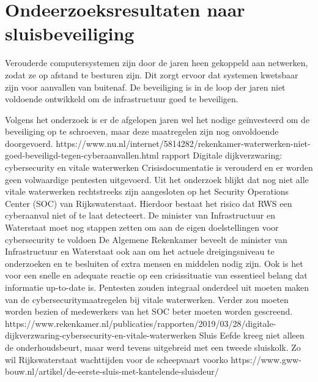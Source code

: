  







 









\section{Ondeerzoeksresultaten naar sluisbeveiliging}



Verouderde computersystemen zijn door de jaren heen gekoppeld aan netwerken, zodat ze op afstand te besturen zijn. Dit zorgt ervoor dat systemen kwetsbaar zijn voor aanvallen van buitenaf. De beveiliging is in de loop der jaren niet voldoende ontwikkeld om de infrastructuur goed te beveiligen.

Volgens het onderzoek is er de afgelopen jaren wel het nodige geïnvesteerd om de beveiliging op te schroeven, maar deze maatregelen zijn nog onvoldoende doorgevoerd.
https://www.nu.nl/internet/5814282/rekenkamer-waterwerken-niet-goed-beveiligd-tegen-cyberaanvallen.html
rapport Digitale dijkverzwaring: cybersecurity en vitale waterwerken 
Crisisdocumentatie is verouderd en er worden geen volwaardige pentesten uitgevoerd. Uit het onderzoek blijkt dat nog niet alle vitale waterwerken rechtstreeks zijn aangesloten op het Security Operations Center (SOC) van Rijkswaterstaat. Hierdoor bestaat het risico dat RWS een cyberaanval niet of te laat detecteert. De minister van Infrastructuur en Waterstaat moet nog stappen zetten om aan de eigen doelstellingen voor cybersecurity te voldoen
De Algemene Rekenkamer beveelt de minister van Infrastructuur en Waterstaat ook aan om het actuele dreigingsniveau te onderzoeken en te besluiten of extra mensen en middelen nodig zijn. Ook is het voor een snelle en adequate reactie op een crisissituatie van essentieel belang dat informatie up-to-date is. Pentesten zouden integraal onderdeel uit moeten maken van de cybersecuritymaatregelen bij vitale waterwerken. Verder zou moeten worden bezien of medewerkers van het SOC beter moeten worden gescreend.
https://www.rekenkamer.nl/publicaties/rapporten/2019/03/28/digitale-dijkverzwaring-cybersecurity-en-vitale-waterwerken
Sluis Eefde kreeg niet alleen de onderhoudsbeurt, maar werd tevens uitgebreid met een tweede sluiskolk. Zo wil Rijkswaterstaat wachttijden voor de scheepvaart voorko
https://www.gww-bouw.nl/artikel/de-eerste-sluis-met-kantelende-sluisdeur/

